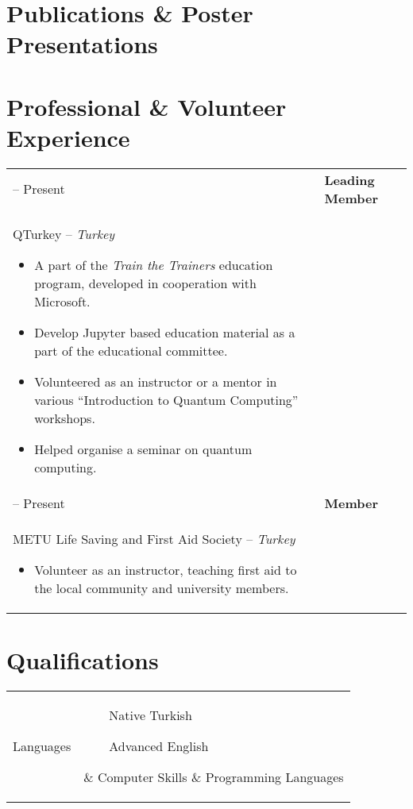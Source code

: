 \documentclass[11pt]{article} %
\makeatletter
\newlength{\firstColumnWidth}
\newlength{\tabusep}
\newlength{\secondColumnWidth}
\newcommand{\tabitem}{~~\llap{--}~~}
\newcommand{\threeecols}[2]{\parbox{
    0.98\secondColumnWidth}{\hfill
    \parbox[t]{0.465\secondColumnWidth}{#1}
    \parbox[t]{0.465\secondColumnWidth}{#2}
    }
}
\newenvironment{twocols}
    {
    \begin{longtable}[h]{%
        @{}%
        >{\raggedleft}p{\firstColumnWidth}%
        @{\hspace{\tabusep}}%
        >{\arraybackslash\raggedright}p{\dimexpr %
            \linewidth-\firstColumnWidth-\tabusep%
        \relax}%
        @{}%
        }
    } {
        \end{longtable}
    }
\makeatother
\begin{document}
\section{Publications \& Poster Presentations}

\nocite{proc, poster}
\printbibliography[heading=none]

\newpage
\section{Professional \& Volunteer Experience}
\begin{twocols}
    2019 -- Present & %
        \textbf{Leading Member} \\
        QTurkey -- \textit{Turkey}
        \begin{itemize}
            \item A part of the \emph{Train the Trainers} education program, developed in cooperation with Microsoft.
            \item Develop Jupyter based education material as a part of the educational committee.
            \item Volunteered as an instructor or a mentor in various “Introduction to Quantum Computing” workshops.
            \item Helped organise a seminar on quantum computing.
        \end{itemize} \tabularnewline
    2018 -- Present & %
        \textbf{Member} \\ 
        METU Life Saving and First Aid Society -- \textit{Turkey}
        \begin{itemize}
            \item Volunteer as an instructor, teaching first aid to the local community and university members.
        \end{itemize}
\end{twocols}

\section{Qualifications}

\begin{twocols}
    Languages & \threeecols{\tabitem Native Turkish}{
    \tabitem Advanced English} \tabularnewline & \tabularnewline
    Computer Skills & %
        Programming Languages\\[.5em]
        \threeecols
            {\tabitem C/C++ \par \tabitem Q\# and QDK \par \tabitem \LaTeX}
            {\tabitem Python \par \tabitem Swift \par \tabitem Haskell}\\[.7em]
        Technologies/Frameworks\\[.3em]
        \threeecols {\tabitem git and Github}{\tabitem Qiskit}
\end{twocols}
\end{document}

